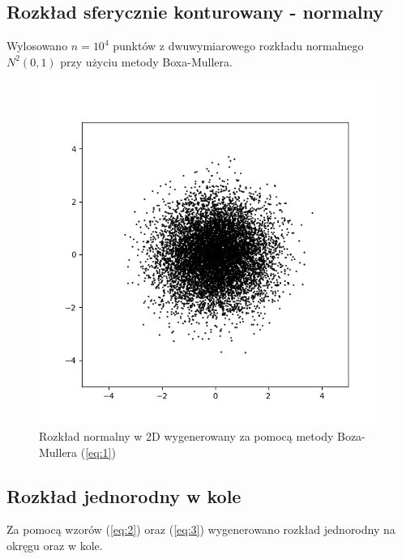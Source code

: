 \documentclass[a4paper,12pt,twoside]{article}
\begin{document}
\subsection{Rozkład sferycznie konturowany - normalny}

Wylosowano $n = 10^4$ punktów z dwuwymiarowego rozkładu normalnego $N^2(0,1)$ przy użyciu metody Boxa-Mullera. 
 
 \begin{figure}[h!]
    \centering
        \includegraphics[scale = 0.6]{Carlo_1.png}
    \caption{Rozkład normalny w 2D wygenerowany za pomocą metody Boza-Mullera (\ref{eq:1}) }
\end{figure}

 \subsection{Rozkład jednorodny w kole}

Za pomocą wzorów (\ref{eq:2}) oraz (\ref{eq:3}) wygenerowano rozkład jednorodny na okręgu oraz w kole. 
\end{document}
